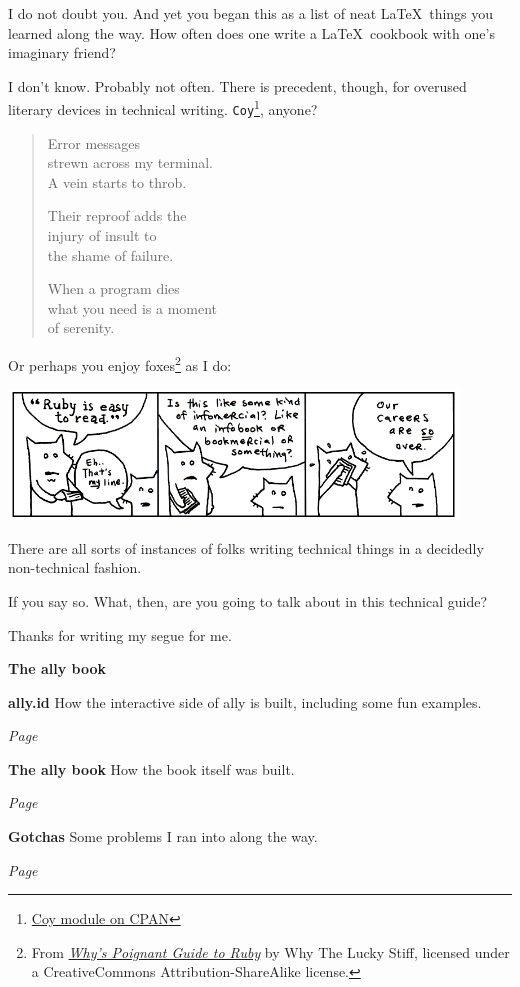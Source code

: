 \begin{paracol}{2}
\begin{leftcolumn}
\begin{ally}
  I do not doubt you. And yet you began this as a list of neat \LaTeX\ things you learned along the way. How often does one write a \LaTeX\ cookbook with one's imaginary friend?
\end{ally}
I don't know. Probably not often. There is precedent, though, for overused literary devices in technical writing. \texttt{Coy}\footnote{\href{https://metacpan.org/pod/Coy}{Coy module on CPAN}}, anyone? 

\begin{verse}
  Error messages\\
  strewn across my terminal.\\
  A vein starts to throb. 
   
  Their reproof adds the\\
  injury of insult to\\
  the shame of failure. 
   
  When a program dies\\
  what you need is a moment\\
  of serenity. 
\end{verse}

\noindent Or perhaps you enjoy foxes\footnote{From \href{https://poignant.guide}{\emph{Why's Poignant Guide to Ruby}} by Why The Lucky Stiff, licensed under a CreativeCommons Attribution-ShareAlike license.} as I do:

\noindent\includegraphics[width=4.7in]{assets/the.foxes-3.png}

There are all sorts of instances of folks writing technical things in a decidedly non-technical fashion.

\begin{ally}
  If you say so. What, then, are you going to talk about in this technical guide?
\end{ally}
Thanks for writing my segue for me.

\begin{labeling}{\textbf{The ally book}}
  \item[\textbf{ally.id}] How the interactive side of ally is built, including some fun examples.

  \emph{Page \pageref{site}}
  \item[\textbf{The ally book}] How the book itself was built.

  \emph{Page \pageref{book}}
  \item[\textbf{Gotchas}] Some problems I ran into along the way.

  \emph{Page \pageref{gotchas}}
\end{labeling}

\end{leftcolumn}
\end{paracol}
